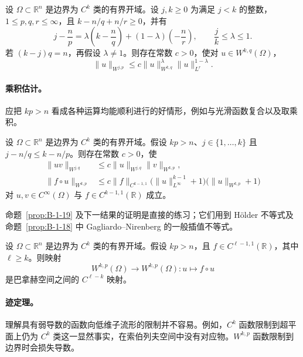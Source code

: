 \begin{proposition}\label{prop:B-1-18}
设 $\Omega\subset\mathbb R^n$ 是边界为 $C^k$ 类的有界开域。设 $j,k\ge0$ 为满足 $j<k$ 的整数，$1\le p,q,r\le\infty$，且 $k-n/q+n/r\ge0$，并有
\[
j-\frac np=\lambda\left(k-\frac nq\right)
+(1-\lambda)\left(-\frac nr\right),
\qquad\frac jk\le\lambda\le1.
\]
若 $(k-j)q=n$，再假设 $\lambda\ne1$。则存在常数 $c>0$，使对 $u\in W^{k,q}(\Omega)$，
\[
\|u\|_{W^{j,p}}\le c\|u\|_{W^{k,q}}^\lambda\|u\|_{L^r}^{1-\lambda}.
\]
\end{proposition}

\paragraph{乘积估计。} 应把 $kp>n$ 看成各种运算均能顺利进行的好情形，例如与光滑函数复合以及取乘积。

\begin{proposition}\label{prop:B-1-19}
设 $\Omega\subset\mathbb R^n$ 是边界为 $C^k$ 类的有界开域。假设 $kp>n$、$j\in\{1,\ldots,k\}$ 且 $j-n/q\le k-n/p$。则存在常数 $c>0$，使
\begin{align*}
\|uv\|_{W^{j,q}}&\le c\|u\|_{W^{j,q}}\|v\|_{W^{k,p}},\\
\|f\circ u\|_{W^{k,p}}&\le c\|f\|_{C^{k-1,1}}
\bigl(\|u\|_{L^\infty}^{k-1}+1\bigr)
\bigl(\|u\|_{W^{k,p}}+1\bigr)
\end{align*}
对 $u,v\in C^\infty(\Omega)$ 与 $f\in C^{k-1,1}(\mathbb R)$ 成立。
\end{proposition}

命题~\ref{prop:B-1-19} 及下一结果的证明是直接的练习；它们用到 Hölder 不等式及命题~\ref{prop:B-1-18} 中 Gagliardo--Nirenberg 的一般插值不等式。

\begin{proposition}\label{prop:B-1-20}
设 $\Omega\subset\mathbb R^n$ 是边界为 $C^k$ 类的有界开域。假设 $kp>n$，且 $f\in C^{\ell-1,1}(\mathbb R)$，其中 $\ell\ge k$。则映射
\[
W^{k,p}(\Omega)\to W^{k,p}(\Omega):u\mapsto f\circ u
\]
是巴拿赫空间之间的 $C^{\ell-k}$ 映射。
\end{proposition}

\paragraph{迹定理。} 理解具有弱导数的函数向低维子流形的限制并不容易。例如，$C^k$ 函数限制到超平面上仍为 $C^k$ 类这一显然事实，在索伯列夫空间中没有对应物。$W^{k,p}$ 函数限制到边界时会损失导数。

